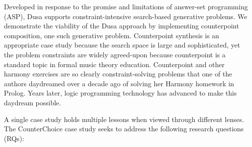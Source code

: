 


Developed in response to the promise and limitations of
answer-set programming (ASP), Dusa supports constraint-intensive
search-based generative problems. 
We demonstrate the viability of the Dusa approach by implementing 
counterpoint composition, one such generative problem.  
Counterpoint synthesis is an appropriate case study
because the search space is large and sophisticated,
yet the problem constraints are widely agreed-upon because counterpoint is a standard topic
in formal music theory education.  Counterpoint and other harmony exercises
are so clearly constraint-solving problems that one of the
authors daydreamed over a decade ago of solving her Harmony homework
in Prolog. Years later, logic programming technology has advanced to make
this daydream possible.






A single case study holds multiple lessons when viewed through different
lenses.  The CounterChoice case study seeks to address the following
research questions (RQs):

